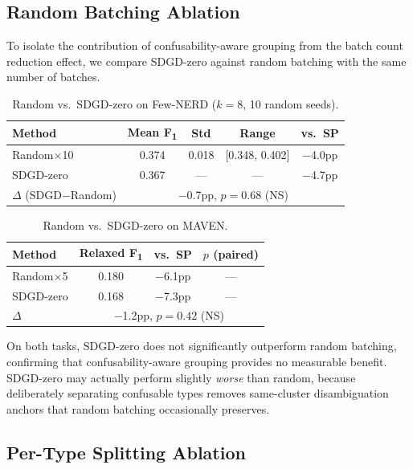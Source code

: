 \documentclass[11pt,a4paper]{article}
\newcommand{\fone}{F\textsubscript{1}}
\begin{document}
\subsection{Random Batching Ablation}
\label{app:random}

To isolate the contribution of confusability-aware grouping from the batch count reduction effect, we compare SDGD-zero against random batching with the same number of batches.

\begin{table}[h]
\centering
\caption{Random vs.\ SDGD-zero on Few-NERD ($k{=}8$, 10 random seeds).}
\label{tab:random_fewnerd}
\small
\begin{tabular}{lcccc}
\toprule
\textbf{Method} & \textbf{Mean \fone{}} & \textbf{Std} & \textbf{Range} & \textbf{vs.\ SP} \\
\midrule
Random$\times$10 & 0.374 & 0.018 & [0.348, 0.402] & $-$4.0pp \\
SDGD-zero & 0.367 & --- & --- & $-$4.7pp \\
$\Delta$ (SDGD$-$Random) & \multicolumn{4}{c}{$-$0.7pp, $p{=}0.68$ (NS)} \\
\bottomrule
\end{tabular}
\end{table}

\begin{table}[h]
\centering
\caption{Random vs.\ SDGD-zero on MAVEN.}
\label{tab:random_maven}
\small
\begin{tabular}{lccc}
\toprule
\textbf{Method} & \textbf{Relaxed \fone{}} & \textbf{vs.\ SP} & \textbf{$p$ (paired)} \\
\midrule
Random$\times$5 & 0.180 & $-$6.1pp & --- \\
SDGD-zero & 0.168 & $-$7.3pp & --- \\
$\Delta$ & \multicolumn{3}{c}{$-$1.2pp, $p{=}0.42$ (NS)} \\
\bottomrule
\end{tabular}
\end{table}

On both tasks, SDGD-zero does not significantly outperform random batching, confirming that confusability-aware grouping provides no measurable benefit.
SDGD-zero may actually perform slightly \emph{worse} than random, because deliberately separating confusable types removes same-cluster disambiguation anchors that random batching occasionally preserves.

\subsection{Per-Type Splitting Ablation}
\label{app:pertype}
\end{document}

